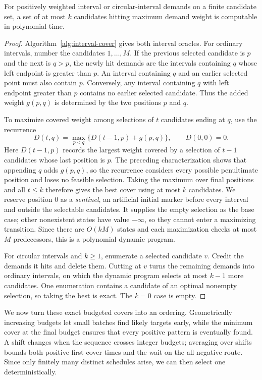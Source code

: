 \begin{lemma}\label{lem:budget-coverage}
For positively weighted interval or circular-interval demands on
a finite candidate set, a set of at most $k$ candidates hitting
maximum demand weight is computable in polynomial time.
\end{lemma}
\begin{proof}
Algorithm~\ref{alg:interval-cover} gives both interval oracles.
For ordinary intervals, number the candidates $1,\ldots,M$.
If the previous selected candidate is $p$ and the next is $q>p$,
the newly hit demands are the intervals containing $q$ whose left
endpoint is greater than $p$. An interval containing
$q$ and an earlier selected point must also contain $p$.
Conversely, any interval containing $q$ with left endpoint greater
than $p$ contains no earlier selected candidate. Thus the added
weight $g(p,q)$ is determined by the two positions $p$ and $q$.

To maximize covered weight among selections of $t$ candidates ending
at $q$, use the recurrence
\[
 D(t,q)=\max_{p<q}\{D(t-1,p)+g(p,q)\},
 \qquad D(0,0)=0.
\]
Here $D(t-1,p)$ records the largest weight covered by a selection
of $t-1$ candidates whose last position is $p$. The preceding
characterization shows that appending $q$ adds $g(p,q)$, so the recurrence
considers every possible penultimate position and loses no feasible
selection. Taking the maximum over final positions and all $t\le k$
therefore gives the best cover using at most $k$ candidates.
We reserve position $0$ as a \emph{sentinel}, an artificial initial
marker before every interval and outside the selectable candidates.
It supplies the empty selection as the base case; other nonexistent
states have value $-\infty$, so they cannot enter a maximizing
transition. Since there are $O(kM)$ states and each maximization
checks at most $M$ predecessors, this is a polynomial dynamic program.

For circular intervals and $k\ge1$, enumerate a selected candidate
$v$. Credit the demands it hits and delete them. Cutting at $v$
turns the remaining demands into ordinary intervals, on which
the dynamic program selects at most $k-1$ more candidates.
One enumeration contains a candidate of an optimal nonempty
selection, so taking the best is exact. The $k=0$ case is empty.
\end{proof}



We now turn these exact budgeted covers into an ordering. Geometrically
increasing budgets let small batches find likely targets early, while
the minimum cover at the final budget ensures that every positive
pattern is eventually found. A shift changes when the sequence crosses
integer budgets; averaging over shifts bounds both positive first-cover
times and the wait on the all-negative route. Since only finitely many
distinct schedules arise, we can then select one deterministically.


